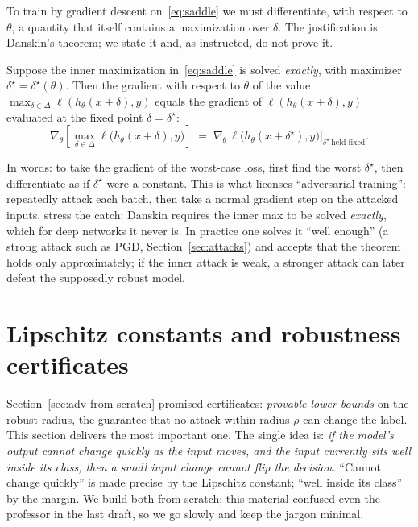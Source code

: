 To train by gradient descent on~\eqref{eq:saddle} we must differentiate, with respect to $\theta$, a quantity that itself contains a maximization over $\delta$. The justification is Danskin's theorem; we state it and, as instructed, do not prove it.

\begin{theorem}
\label{thm:danskin}
Suppose the inner maximization in~\eqref{eq:saddle} is solved \emph{exactly}, with maximizer $\delta^\star=\delta^\star(\theta)$. Then the gradient with respect to $\theta$ of the value $\max_{\delta\in\Delta}\ell(h_\theta(x+\delta),y)$ equals the gradient of $\ell(h_\theta(x+\delta),y)$ evaluated at the fixed point $\delta=\delta^\star$:
\[
  \nabla_\theta\!\left[\max_{\delta\in\Delta}\ell\big(h_\theta(x+\delta),y\big)\right]
  \;=\; \nabla_\theta\,\ell\big(h_\theta(x+\delta^\star),y\big)\Big|_{\delta^\star\ \text{held fixed}} .
\]
\end{theorem}

In words: to take the gradient of the worst-case loss, first find the worst $\delta^\star$, then differentiate as if $\delta^\star$ were a constant. This is what licenses ``adversarial training'': repeatedly attack each batch, then take a normal gradient step on the attacked inputs. \citet{kolter2018adversarial} stress the catch: Danskin requires the inner max to be solved \emph{exactly}, which for deep networks it never is. In practice one solves it ``well enough'' (a strong attack such as PGD, Section~\ref{sec:attacks}) and accepts that the theorem holds only approximately; if the inner attack is weak, a stronger attack can later defeat the supposedly robust model.

\section{Lipschitz constants and robustness certificates}
\label{sec:lipschitz}

Section~\ref{sec:adv-from-scratch} promised certificates: \emph{provable lower bounds} on the robust radius, the guarantee that no attack within radius $\rho$ can change the label. This section delivers the most important one. The single idea is: \emph{if the model's output cannot change quickly as the input moves, and the input currently sits well inside its class, then a small input change cannot flip the decision.} ``Cannot change quickly'' is made precise by the Lipschitz constant; ``well inside its class'' by the margin. We build both from scratch; this material confused even the professor in the last draft, so we go slowly and keep the jargon minimal.

